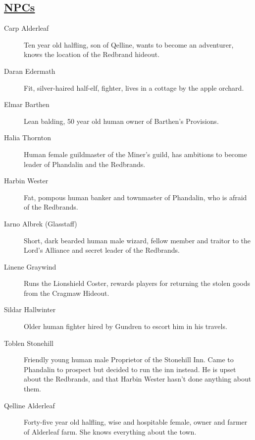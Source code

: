 \subsection{\underline{NPCs}}
\begin{description}
	\item[Carp Alderleaf] Ten year old halfling, son of Qelline, wants to become an adventurer, knows the location of the Redbrand hideout.
	\item[Daran Edermath] Fit, silver-haired half-elf, fighter, lives in a cottage by the apple orchard.
	\item[Elmar Barthen] Lean balding, 50 year old human owner of Barthen's Provisions.
	\item[Halia Thornton] Human female guildmaster of the Miner's guild, has ambitions to become leader of Phandalin and the Redbrands.
	\item[Harbin Wester] Fat, pompous human banker and townmaster of Phandalin, who is afraid of the Redbrands.
	\item[Iarno Albrek (Glasstaff)] Short, dark bearded human male wizard, fellow member and traitor to the Lord's Alliance and secret leader of the Redbrands.
	\item[Linene Graywind] Runs the Lionshield Coster, rewards players for returning the stolen goods from the Cragmaw Hideout.
	\item[Sildar Hallwinter] Older human fighter hired by Gundren to escort him in his travels.
	\item[Toblen Stonehill] Friendly young human male Proprietor of the Stonehill Inn. Came to Phandalin to prospect but decided to run the inn instead. He is upset about the Redbrands, and that Harbin Wester hasn't done anything about them.
	\item[Qelline Alderleaf] Forty-five year old halfling, wise and hospitable female, owner and farmer of Alderleaf farm. She knows everything about the town.
\end{description}